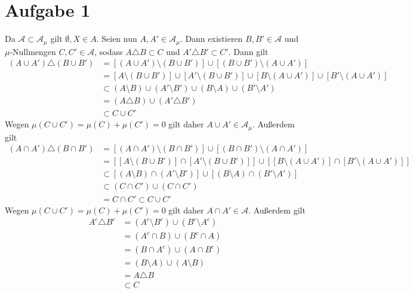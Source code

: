 \documentclass{article}
\begin{document}
    \section*{Aufgabe 1}
    Da $\mathcal{A} \subset \mathcal{A}_\mu$ gilt $\emptyset, X \in A$.
    Seien nun $A, A' \in \mathcal{A}_\mu$. 
    Dann existieren $B, B'\in \mathcal{A}$ und $\mu$-Nullmengen $C, C'\in \mathcal{A}$, sodass $A\triangle B \subset C$ und $A'\triangle B' \subset C'$.
    Dann gilt
    \begin{align*}
        (A\cup A')\triangle (B\cup B') &= [(A\cup A')\setminus (B \cup B')] \cup [(B\cup B')\setminus (A\cup A')]\\
        &= [A\setminus(B \cup B')] \cup [A'\setminus(B \cup B')] \cup [B\setminus (A\cup A')] \cup [B'\setminus (A\cup A')]\\
        &\subset (A\setminus B) \cup (A'\setminus B') \cup (B\setminus A) \cup (B'\setminus A')\\
        &= (A \triangle B) \cup (A'\triangle B')\\
        &\subset C\cup C'
    \end{align*}
    Wegen $\mu(C \cup C') = \mu(C) + \mu(C') = 0$ gilt daher $A\cup A' \in \mathcal{A}_\mu$.
    Außerdem gilt
    \begin{align*}
        (A\cap A')\triangle (B\cap B') &= [(A\cap A')\setminus (B \cap B')] \cup [(B\cap B')\setminus (A\cap A')]\\
        &= [[A\setminus(B \cup B')] \cap [A'\setminus(B \cup B')]] \cup [[B\setminus (A\cup A')] \cap [B'\setminus (A\cup A')]]\\
        &\subset [(A\setminus B) \cap (A'\setminus B')] \cup [(B\setminus A) \cap (B'\setminus A')]\\
        &\subset (C \cap C') \cup (C \cap C')\\
        &= C\cap C'\subset C\cup C'
    \end{align*} 
    Wegen $\mu(C \cup C') = \mu(C) + \mu(C') = 0$ gilt daher $A\cap A' \in \mathcal{A}$.
    Außerdem gilt
    \begin{align*}
        A^c \triangle B^c &= (A^c \setminus B^c) \cup (B^c \setminus A^c)\\
        &= (A^c \cap B) \cup (B^c \cap A)\\
        &= (B \cap A^c) \cup (A \cap B^c)\\
        &= (B\setminus A) \cup (A \setminus B)\\
        &= A \triangle B\\  
        &\subset C
    \end{align*} 
\end{document}
